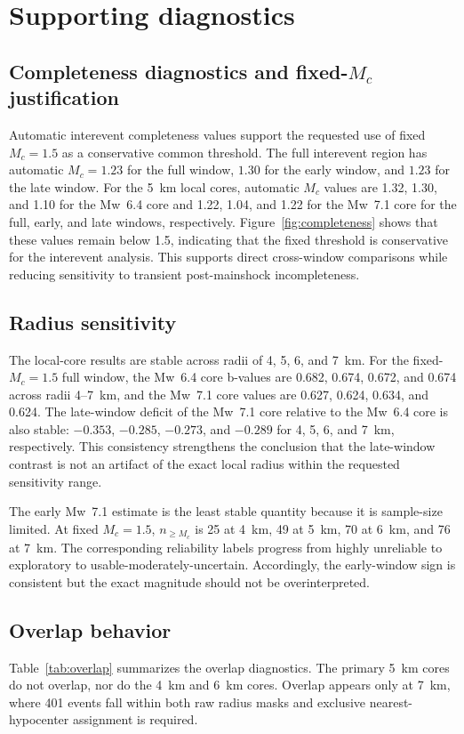 \documentclass[11pt]{article}
\begin{document}
\section{Supporting diagnostics}
\subsection{Completeness diagnostics and fixed-$M_c$ justification}
Automatic interevent completeness values support the requested use of fixed $M_c=1.5$ as a conservative common threshold. The full interevent region has automatic $M_c=1.23$ for the full window, $1.30$ for the early window, and $1.23$ for the late window. For the 5~km local cores, automatic $M_c$ values are 1.32, 1.30, and 1.10 for the Mw~6.4 core and 1.22, 1.04, and 1.22 for the Mw~7.1 core for the full, early, and late windows, respectively. Figure~\ref{fig:completeness} shows that these values remain below 1.5, indicating that the fixed threshold is conservative for the interevent analysis. This supports direct cross-window comparisons while reducing sensitivity to transient post-mainshock incompleteness.

\subsection{Radius sensitivity}
The local-core results are stable across radii of 4, 5, 6, and 7~km. For the fixed-$M_c=1.5$ full window, the Mw~6.4 core b-values are 0.682, 0.674, 0.672, and 0.674 across radii 4--7~km, and the Mw~7.1 core values are 0.627, 0.624, 0.634, and 0.624. The late-window deficit of the Mw~7.1 core relative to the Mw~6.4 core is also stable: $-0.353$, $-0.285$, $-0.273$, and $-0.289$ for 4, 5, 6, and 7~km, respectively. This consistency strengthens the conclusion that the late-window contrast is not an artifact of the exact local radius within the requested sensitivity range.

The early Mw~7.1 estimate is the least stable quantity because it is sample-size limited. At fixed $M_c=1.5$, $n_{\ge M_c}$ is 25 at 4~km, 49 at 5~km, 70 at 6~km, and 76 at 7~km. The corresponding reliability labels progress from highly unreliable to exploratory to usable-moderately-uncertain. Accordingly, the early-window sign is consistent but the exact magnitude should not be overinterpreted.

\subsection{Overlap behavior}
Table~\ref{tab:overlap} summarizes the overlap diagnostics. The primary 5~km cores do not overlap, nor do the 4~km and 6~km cores. Overlap appears only at 7~km, where 401 events fall within both raw radius masks and exclusive nearest-hypocenter assignment is required.
\end{document}

